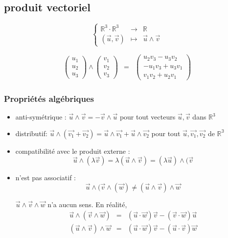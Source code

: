 	\subsection{produit vectoriel}

	\[\left\{\begin{array}{rcl}
				\mathbb{R}^3 \cdot \mathbb{R}^3 &\rightarrow& \mathbb{R} \\
				(\vec{u}, \vec{v}) &\mapsto& \vec{u} \wedge \vec{v}
		\end{array}\right.\]

		\[\begin{array}{rcl}
				\begin{pmatrix}
					u_1 \\
					u_2 \\
				u_3\end{pmatrix} \wedge 
				\begin{pmatrix}
					v_1 \\
					v_2 \\
				v_3\end{pmatrix} &=& \begin{pmatrix}
						u_2v_3 - u_3v_2 \\
						-u_1v_3 + u_3v_1 \\
				v_1v_2 + u_2v_1\end{pmatrix}\end{array}\]

	\subsubsection{Propriétés algébriques}
	\begin{itemize}
		\item anti-symétrique : $\vec{u}\wedge \vec{v} = -\vec{v}\wedge \vec{u}$ pour tout vecteurs $\vec{u}, \vec{v}$ dans $\mathbb{R}^3$
		\item distributif: $\vec{u}\wedge(\vec{v_1}+\vec{v_2}) = \vec{u}\wedge \vec{v_1} + \vec{u}\wedge\vec{v_2}$ pour tout $\vec{u}, \vec{v_1}, \vec{v_2}$ de $\mathbb{R^3}$
		\item compatibilité avec le produit externe : \[\vec{u}\wedge(\lambda \vec{v}) = \lambda(\vec{u} \wedge \vec{v}) = (\lambda \vec{u})\wedge(\vec{v}\]
		\item n'est pas associatif : \[\vec{u}\wedge(\vec{v}\wedge(\vec{w}) \neq (\vec{u}\wedge\vec{v})\wedge \vec{w}\]

			$\vec{u}\wedge \vec{v} \wedge \vec{w}$ n'a aucun sens.
			En réalité, \[\begin{array}{rcl}
					\vec{u} \wedge (\vec{v}\wedge \vec{w}) &=& (\vec{u}\cdot \vec{w}) \vec{v} - (\vec{v}\cdot \vec{w}) \vec{u}\\ 
			(\vec{u} \wedge \vec{v})\wedge \vec{w} &=& (\vec{u}\cdot \vec{w}) \vec{v} - (\vec{u}\cdot \vec{v}) \vec{w}\end{array}\] 
		\end{itemize}

